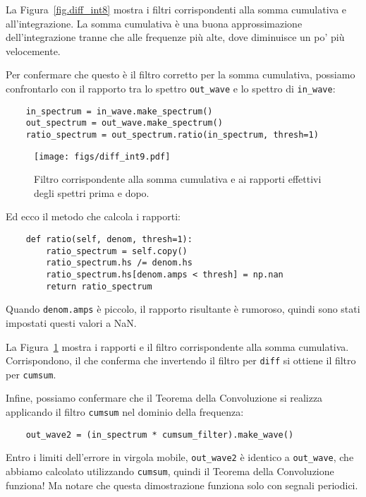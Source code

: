 \documentclass[12pt]{book} \usepackage[width=5.5in,height=8.5in, hmarginratio=3:2,vmarginratio=1:1]{geometry}
\begin{document}
La Figura~\ref{fig.diff_int8} mostra i filtri corrispondenti alla somma cumulativa e all'integrazione. La somma cumulativa è una buona approssimazione dell'integrazione tranne che alle frequenze più alte, dove diminuisce un po' più velocemente.

Per confermare che questo è il filtro corretto per la somma cumulativa, possiamo confrontarlo con il rapporto tra lo spettro \verb"out_wave" e lo spettro di \verb"in_wave":

\begin{verbatim} 
    in_spectrum = in_wave.make_spectrum()
    out_spectrum = out_wave.make_spectrum()
    ratio_spectrum = out_spectrum.ratio(in_spectrum, thresh=1)
 \end{verbatim} 

\begin{figure} 

\centerline{\texttt{[image: figs/diff\_int9.pdf]}} \caption{Filtro corrispondente alla somma cumulativa e ai rapporti effettivi degli spettri prima e dopo.} \label{fig.diff_int9} \end{figure} 

Ed ecco il metodo che calcola i rapporti:

\begin{verbatim} 
    def ratio(self, denom, thresh=1):
        ratio_spectrum = self.copy()
        ratio_spectrum.hs /= denom.hs
        ratio_spectrum.hs[denom.amps < thresh] = np.nan
        return ratio_spectrum
 \end{verbatim} 

Quando {\tt denom.amps} è piccolo, il rapporto risultante è rumoroso, quindi sono stati impostati questi valori a NaN.

La Figura~\ref{fig.diff_int9} mostra i rapporti e il filtro corrispondente alla somma cumulativa. Corrispondono, il che conferma che invertendo il filtro per {\tt diff} si ottiene il filtro per {\tt cumsum}.

Infine, possiamo confermare che il Teorema della Convoluzione si realizza applicando il filtro {\tt cumsum} nel dominio della frequenza:

\begin{verbatim} 
    out_wave2 = (in_spectrum * cumsum_filter).make_wave()
 \end{verbatim} 

Entro i limiti dell'errore in virgola mobile, \verb"out_wave2" è identico a \verb"out_wave", che abbiamo calcolato utilizzando {\tt cumsum}, quindi il Teorema della Convoluzione funziona! Ma notare che questa dimostrazione funziona solo con segnali periodici.
\end{document}
